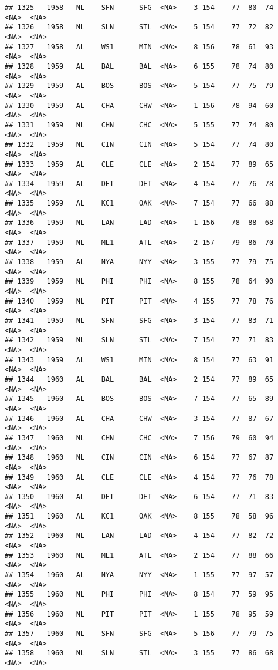 \documentclass[]{article}
\begin{document}
\begin{verbatim}
## 1325   1958   NL    SFN      SFG  <NA>    3 154    77  80  74   <NA>  <NA>
## 1326   1958   NL    SLN      STL  <NA>    5 154    77  72  82   <NA>  <NA>
## 1327   1958   AL    WS1      MIN  <NA>    8 156    78  61  93   <NA>  <NA>
## 1328   1959   AL    BAL      BAL  <NA>    6 155    78  74  80   <NA>  <NA>
## 1329   1959   AL    BOS      BOS  <NA>    5 154    77  75  79   <NA>  <NA>
## 1330   1959   AL    CHA      CHW  <NA>    1 156    78  94  60   <NA>  <NA>
## 1331   1959   NL    CHN      CHC  <NA>    5 155    77  74  80   <NA>  <NA>
## 1332   1959   NL    CIN      CIN  <NA>    5 154    77  74  80   <NA>  <NA>
## 1333   1959   AL    CLE      CLE  <NA>    2 154    77  89  65   <NA>  <NA>
## 1334   1959   AL    DET      DET  <NA>    4 154    77  76  78   <NA>  <NA>
## 1335   1959   AL    KC1      OAK  <NA>    7 154    77  66  88   <NA>  <NA>
## 1336   1959   NL    LAN      LAD  <NA>    1 156    78  88  68   <NA>  <NA>
## 1337   1959   NL    ML1      ATL  <NA>    2 157    79  86  70   <NA>  <NA>
## 1338   1959   AL    NYA      NYY  <NA>    3 155    77  79  75   <NA>  <NA>
## 1339   1959   NL    PHI      PHI  <NA>    8 155    78  64  90   <NA>  <NA>
## 1340   1959   NL    PIT      PIT  <NA>    4 155    77  78  76   <NA>  <NA>
## 1341   1959   NL    SFN      SFG  <NA>    3 154    77  83  71   <NA>  <NA>
## 1342   1959   NL    SLN      STL  <NA>    7 154    77  71  83   <NA>  <NA>
## 1343   1959   AL    WS1      MIN  <NA>    8 154    77  63  91   <NA>  <NA>
## 1344   1960   AL    BAL      BAL  <NA>    2 154    77  89  65   <NA>  <NA>
## 1345   1960   AL    BOS      BOS  <NA>    7 154    77  65  89   <NA>  <NA>
## 1346   1960   AL    CHA      CHW  <NA>    3 154    77  87  67   <NA>  <NA>
## 1347   1960   NL    CHN      CHC  <NA>    7 156    79  60  94   <NA>  <NA>
## 1348   1960   NL    CIN      CIN  <NA>    6 154    77  67  87   <NA>  <NA>
## 1349   1960   AL    CLE      CLE  <NA>    4 154    77  76  78   <NA>  <NA>
## 1350   1960   AL    DET      DET  <NA>    6 154    77  71  83   <NA>  <NA>
## 1351   1960   AL    KC1      OAK  <NA>    8 155    78  58  96   <NA>  <NA>
## 1352   1960   NL    LAN      LAD  <NA>    4 154    77  82  72   <NA>  <NA>
## 1353   1960   NL    ML1      ATL  <NA>    2 154    77  88  66   <NA>  <NA>
## 1354   1960   AL    NYA      NYY  <NA>    1 155    77  97  57   <NA>  <NA>
## 1355   1960   NL    PHI      PHI  <NA>    8 154    77  59  95   <NA>  <NA>
## 1356   1960   NL    PIT      PIT  <NA>    1 155    78  95  59   <NA>  <NA>
## 1357   1960   NL    SFN      SFG  <NA>    5 156    77  79  75   <NA>  <NA>
## 1358   1960   NL    SLN      STL  <NA>    3 155    77  86  68   <NA>  <NA>

\end{verbatim}
\end{document}
